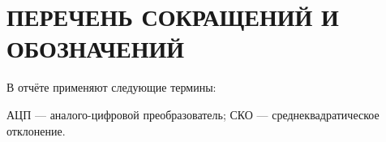 \section*{ПЕРЕЧЕНЬ СОКРАЩЕНИЙ И ОБОЗНАЧЕНИЙ}
В отчёте применяют следующие термины:

АЦП — аналого-цифровой преобразователь; %
СКО — среднеквадратическое отклонение. %
